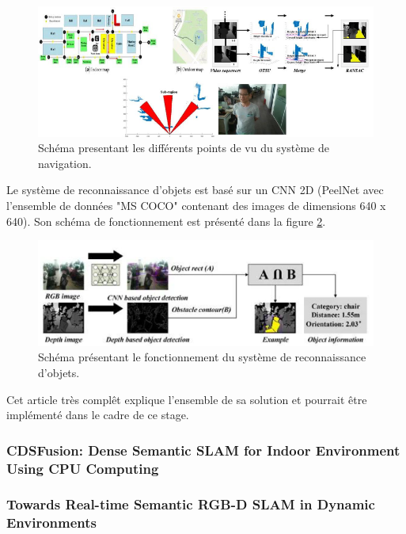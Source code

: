 \documentclass[11pt]{article}
\begin{document}
  \begin{figure}[hbt]  
    \includegraphics[width=\textwidth]{NavigationP1.png}    
    \caption{Schéma presentant les différents points de vu du système de navigation.}
    \label{fig:NavigationP1}
  \end{figure} 

  Le système de reconnaissance d'objets est basé sur un CNN 2D (PeelNet avec l'ensemble de données "MS COCO" contenant des images de dimensions
  640 x 640). Son schéma de fonctionnement est présenté dans la figure \ref{fig:ReconnaissanceP1}.

  \begin{figure}[hbt]  
    \includegraphics[width=\textwidth]{RecognitionP1.png}    
    \caption{Schéma présentant le fonctionnement du système de reconnaissance d'objets.}
    \label{fig:ReconnaissanceP1}
  \end{figure} 

  Cet article très complêt explique l'ensemble de sa solution et pourrait être implémenté dans le cadre de ce stage. 
  
  \pagebreak

  \subsubsection{CDSFusion: Dense Semantic SLAM for Indoor Environment Using CPU
  Computing}

  \pagebreak
 
  \subsubsection{Towards Real-time Semantic RGB-D SLAM in Dynamic Environments}
\end{document}
